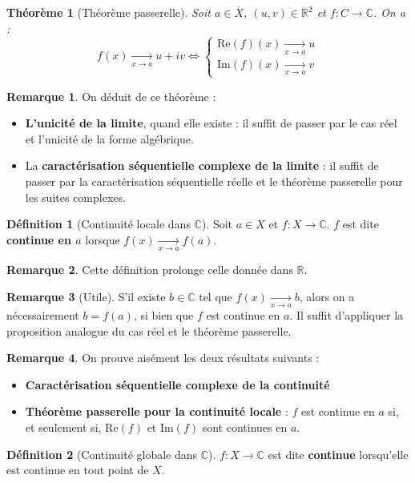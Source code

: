 \documentclass[french]{book}
\newcommand{\R}{\mathbb{R}}
\newcommand{\C}{\mathbb{C}}
\theoremstyle{plain}
\newtheorem{thm}{Théorème}[chapter]
\theoremstyle{definition}
\newtheorem{dfn}{Définition}[chapter]
\newtheorem{rmq}{Remarque}[chapter]
\theoremstyle{remark}
\begin{document}
\begin{thm}[Théorème passerelle]
	Soit $a\in\overline{X}$, $(u,v)\in\R^2$ et $f:C\rightarrow\C$. On a : $$f(x)\xrightarrow[x\to a]{}u+iv\iff\begin{cases}
		\text{Re}(f)(x)\xrightarrow[x\to a]{}u \\
		\text{Im}(f)(x)\xrightarrow[x\to a]{}v
	\end{cases}$$
\end{thm}
\begin{rmq}
	On déduit de ce théorème : \begin{itemize}
		\item \textbf{L'unicité de la limite}, quand elle existe : il suffit de passer par le cas réel et l'unicité de la forme algébrique.
		\item La \textbf{caractérisation séquentielle complexe de la limite} : il suffit de passer par la caractérisation séquentielle réelle et le théorème passerelle pour les suites complexes.
	\end{itemize}
\end{rmq}
\begin{dfn}[Continuité locale dans $\C$]
	Soit $a\in X$ et $f:X\rightarrow\C$. $f$ est dite \textbf{continue en $a$} lorsque $f(x)\xrightarrow[x\to a]{}f(a)$.
\end{dfn}
\begin{rmq}
	Cette définition prolonge celle donnée dans $\R$.
\end{rmq}
\begin{rmq}[Utile]
	S'il existe $b\in\C$ tel que $f(x)\xrightarrow[x\to a]{}b$, alors on a nécessairement $b=f(a)$, si bien que $f$ est continue en $a$. Il suffit d'appliquer la proposition analogue du cas réel et le théorème passerelle.
\end{rmq}
\begin{rmq}
	On prouve aisément les deux résultats suivants : 
	\begin{itemize}
		\item \textbf{Caractérisation séquentielle complexe de la continuité}
		\item \textbf{Théorème passerelle pour la continuité locale} : $f$ est continue en $a$ si, et seulement si, $\text{Re}(f)$ et $\text{Im}(f)$ sont continues en $a$.
	\end{itemize}
\end{rmq}
\begin{dfn}[Continuité globale dans $\C$]
	$f:X\rightarrow\C$ est dite \textbf{continue} lorsqu'elle est continue en tout point de $X$.
\end{dfn}
\end{document}
